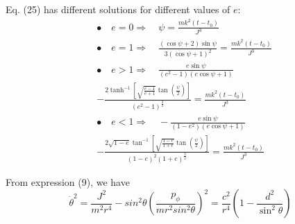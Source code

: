 \documentclass[conference]{IEEEtran}
\begin{document}
Eq. (25) has different solutions for different values of $e$: 
\begin{equation}
\begin{split}
&\bullet \quad e=0 \Rightarrow \quad \psi = \frac{m k^{2}\left(t - t_{0}\right)}{J^{3}} \\
&\bullet \quad e=1 \Rightarrow \quad \frac{\left(\cos{\psi}+2\right)\sin{\psi}}{3\left(\cos{\psi}+1\right)^{2}} = \frac{m k^{2}\left(t - t_{0}\right)}{J^{3}} \\
&\bullet \quad e>1 \Rightarrow \quad \frac{e\sin{\psi}}{\left(e^{2}-1\right)\left(e\cos{\psi} +1\right)} \\
&-\frac{2\tanh^{-1}{\left[\sqrt{\frac{e-1}{e+1}}\tan{\left(\frac{\psi}{2}\right)}\right]}}{\left(e^{2}-1\right)^{\frac{3}{2}}} =\frac{m k^{2}\left(t - t_{0}\right)}{J^{3}}\\
&\bullet \quad e <1 \Rightarrow \quad -\frac{e\sin{\psi}}{\left(1 - e^{2}\right)\left(e\cos{\psi} +1\right)} \\
&-\frac{2\sqrt{1-e}\tan^{-1}{\left[\sqrt{\frac{1-e}{1+e}}\tan{\left(\frac{\psi}{2}\right)}\right]}}{\left(1-e\right)^{2}\left(1+e\right)^{\frac{3}{2}}} =\frac{m k^{2}\left(t - t_{0}\right)}{J^{3}}
\end{split}
\end{equation}

From expression (9), we have \begin{dmath}\dot{\theta}^{2} =  \frac{J^2}{m^{2}r^{4}} - sin^{2}{\theta}\left(\frac{p_{\phi}}{mr^{2}sin^{2}{\theta}}\right)^{2} = \frac{c^{2}}{r^{4}}\left(1 - \frac{d^{2}}{\sin^{2}{\theta}}\right)\end{dmath} 
\end{document}
